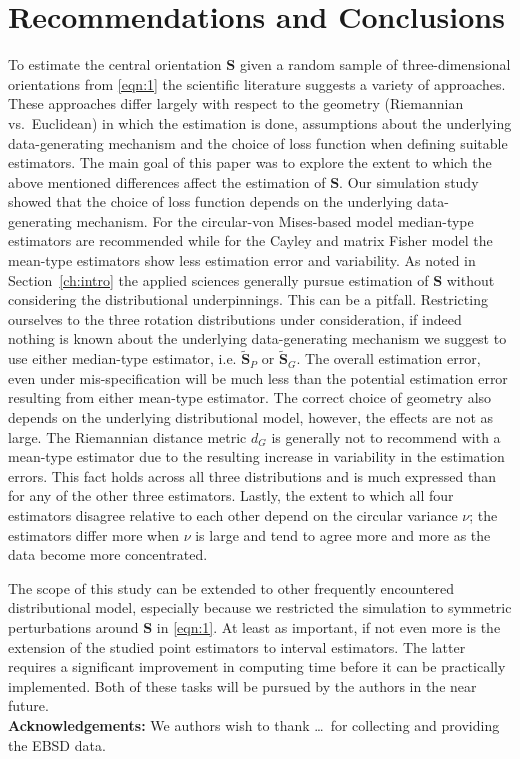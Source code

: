 
\section{Recommendations and Conclusions}\label{sec:disc}

To estimate the central orientation $\bm S$ given a random sample of three-dimensional orientations from \eqref{eqn:1} the scientific literature suggests a variety of approaches. These approaches differ largely with respect to the geometry (Riemannian vs.~Euclidean) in which the estimation is done, assumptions about the underlying data-generating mechanism and the choice of loss function when defining suitable estimators. The main goal of this paper was to explore the extent to which the above mentioned differences affect the estimation of $\bm S$. 
Our simulation study showed that the choice of loss function depends on the underlying data-generating mechanism.  For the circular-von Mises-based model median-type estimators are recommended while for the Cayley and matrix Fisher model the mean-type estimators show less estimation error and variability. As noted in Section~\ref{ch:intro} the applied sciences generally pursue estimation of $\bm S$ without considering the distributional underpinnings. This can be a pitfall. Restricting ourselves to the three rotation distributions under consideration,  if indeed nothing is known about the underlying data-generating mechanism we suggest to use either median-type estimator, i.e. $\widetilde{\bm S}_P$ or $\widetilde{\bm S}_G$. The overall estimation error, even under mis-specification will be much less than the potential estimation error resulting from either mean-type estimator. The correct choice of geometry also depends on the underlying distributional model, however, the effects are not as large. The Riemannian distance metric  $d_G$ is generally not to recommend with a mean-type estimator due to the resulting increase in variability in the estimation errors. This fact holds across all three distributions  and is much expressed than for any of the other three estimators.
Lastly, the extent to which all four estimators disagree relative to each other depend on the circular variance $\nu$; the estimators differ more when $\nu$ is large and tend to agree more and more as the data become more concentrated.  
   
The scope of this study can be extended to other frequently encountered distributional model, especially because we restricted the simulation to symmetric perturbations around $\bm S$ in \eqref{eqn:1}. At least as important, if not even more is the extension of the studied point estimators to interval estimators. The latter requires a significant improvement in computing time before it can be practically implemented. Both of these tasks will be pursued by the authors in the near future.\\

\noindent \textbf{Acknowledgements:} We authors wish to thank \ldots \, for collecting and providing the EBSD data. 

